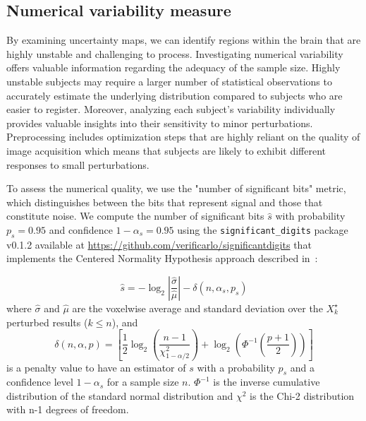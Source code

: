 \documentclass{article}
\begin{document}


\subsection{Numerical variability measure}

By examining uncertainty maps, we can identify regions within the brain that are highly unstable and challenging to process. Investigating numerical variability offers valuable information regarding the adequacy of the sample size. Highly unstable subjects may require a larger number of statistical observations to accurately estimate the underlying distribution compared to subjects who are easier to register. Moreover, analyzing each subject's variability individually provides valuable insights into their sensitivity to minor perturbations. Preprocessing includes optimization steps that are highly reliant on the quality of image acquisition which means that subjects are likely to exhibit different responses to small perturbations.

To assess the numerical quality, we use the "number of significant bits" metric, which distinguishes between the bits that represent signal and those that constitute noise. We compute the number of significant bits $\hat{s}$ with probability $p_s=0.95$ and confidence $1-\alpha_s=0.95$ using the \texttt{significant\_digits} package v0.1.2 available at \url{https://github.com/verificarlo/significantdigits} that implements the Centered Normality Hypothesis approach described in~\cite{sohier2021confidence}:

\[
    \hat{s} = -\log_2 \left| \frac{\hat{\sigma}}{\hat{\mu}} \right| - \delta(n, \alpha_s, p_s)
\]
where $\hat{\sigma}$ and $\hat{\mu}$ are the voxelwise average and standard deviation over the $X_k^\star$ perturbed results ($k \leq n$), and
\[
    \delta(n, \alpha, p) =
    \left[
        \frac{1}{2} \log_2 \left( \frac{n-1}{\chi^2_{1-\alpha/2}} \right) +
        \log_2 \left( \Phi^{-1} \left( \frac{p+1}{2} \right) \right)
        \right]
\]
is a penalty value to have an estimator of $s$ with a probability $p_s$ and a confidence level $1-\alpha_s$ for a sample size $n$. $\Phi^{-1}$ is the inverse cumulative distribution of the standard normal distribution and $\chi^2$ is the Chi-2 distribution with n-1 degrees of freedom.
\end{document}
